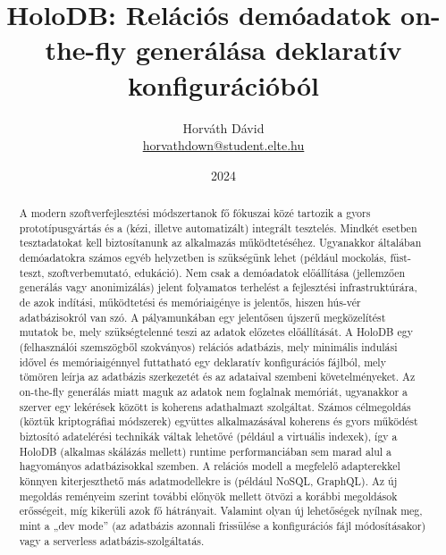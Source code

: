 \documentclass[
    parspace,
    noindent,
    nohyp,
]{elteiktdk}[2023/04/10]
\title{HoloDB: Relációs demóadatok on-the-fly generálása deklaratív konfigurációból}
\date{2024}
\author{Horváth Dávid \\ {\small\href{mailto:horvathdown@student.elte.hu}{horvathdown@student.elte.hu}} }
\affiliation{Mesteroktató}
\begin{document}


\makecover
\cleardoublepage

\maketitle
\cleardoublepage

\begin{spacing}{1.4}
\begin{small}
\tableofcontents
\end{small}
\end{spacing}
\cleardoublepage


\begin{abstract}
A modern szoftverfejlesztési módszertanok fő fókuszai közé tartozik
a gyors prototípusgyártás és a (kézi, illetve automatizált) integrált tesztelés.
Mindkét esetben tesztadatokat kell biztosítanunk az alkalmazás működtetéséhez.
Ugyanakkor általában demóadatokra számos egyéb helyzetben is szükségünk lehet
(például mockolás, füst-teszt, szoftverbemutató, edukáció).
Nem csak a demóadatok előállítása (jellemzően generálás vagy anonimizálás)
jelent folyamatos terhelést a fejlesztési infrastruktúrára,
de azok indítási, működtetési és memóriaigénye is jelentős, hiszen hús-vér adatbázisokról van szó.
A pályamunkában egy jelentősen újszerű megközelítést mutatok be,
mely szükségtelenné teszi az adatok előzetes előállítását.
A HoloDB egy (felhasználói szemszögből szokványos) relációs adatbázis,
mely minimális indulási idővel és memóriaigénnyel futtatható
egy deklaratív konfigurációs fájlból, mely tömören leírja az adatbázis szerkezetét
és az adataival szembeni követelményeket.
Az on-the-fly generálás miatt maguk az adatok nem foglalnak memóriát,
ugyanakkor a szerver egy lekérések között is koherens adathalmazt szolgáltat.
Számos célmegoldás (köztük kriptográfiai módszerek) együttes alkalmazásával
koherens és gyors működést biztosító adatelérési technikák váltak lehetővé (például a virtuális indexek),
így a HoloDB (alkalmas skálázás mellett) runtime performanciában
sem marad alul a hagyományos adatbázisokkal szemben.
A relációs modell a megfelelő adapterekkel könnyen kiterjeszthető más adatmodellekre is
(például NoSQL, GraphQL).
Az új megoldás reményeim szerint további előnyök mellett
ötvözi a korábbi megoldások erősségeit, míg kikerüli azok fő hátrányait.
Valamint olyan új lehetőségek nyílnak meg, mint a „dev mode”
(az adatbázis azonnali frissülése a konfigurációs fájl módosításakor)
vagy a serverless adatbázis-szolgáltatás.
\end{abstract}
\end{document}
